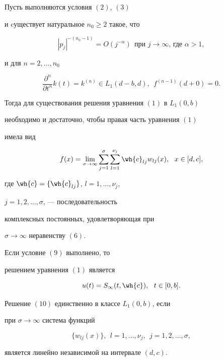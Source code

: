 \begin{thmnonum}


Пусть выполняются условия $(2)$, $(3)$


и cуществует натуральное $n_0\geq 2$ такое, что


\begin{equation}


|p_{j}|^{-(n_0-1)}=O(j^{-\alpha})


\ \ \text{при $j\to\infty$, где $\alpha >1$},


\end{equation}


и для $n=2,\dotsc,n_0$


\begin{equation}


\frac{\partial^n }{\partial t^n}k(t) =


k^{(n)}\in L_1(d-b,d),\ \ f^{(n-1)}(d+0)=0.


\end{equation}


Тогда для существования решения уравнения $(1)$ в $L_1(0,b)$


необходимо и достаточно, чтобы правая часть уравнения $(1)$


имела вид


\begin{equation}


f(x)=\lim_{\sigma\to \infty} \sum _{j=1}^{\sigma}


\sum_{l=1}^{\nu_j}\wh{c}_{lj}w_{lj}(x),


\ \ x\in [d,c],


\end{equation}


где $\wh{c}=\{\wh{ c}_{lj}\}$, $l=1,\dotsc,\nu_j$,


$j=1,2,\dotsc,\sigma$, --- последовательность


комплексных постоянных, удовлетворяющая при


$\sigma\to\infty$ неравенству $(6)$.





Если условие $(9)$ выполнено, то


решением уравнения $(1)$ является


\begin{equation}


u(t)=S_\infty (t,\wh{c}),\ \ t\in [0,b].


\end{equation}


Решение $(10)$ единственно в классе $L_1(0,b)$, если


при $\sigma\to\infty$ система функций


$$


\{w_{lj}(x)\},\ \ l=1,\dotsc,\nu_j,\ \ j=1,2,\dotsc,\sigma,


$$


является линейно независимой на интервале $(d,c)$.


\end{thmnonum}





